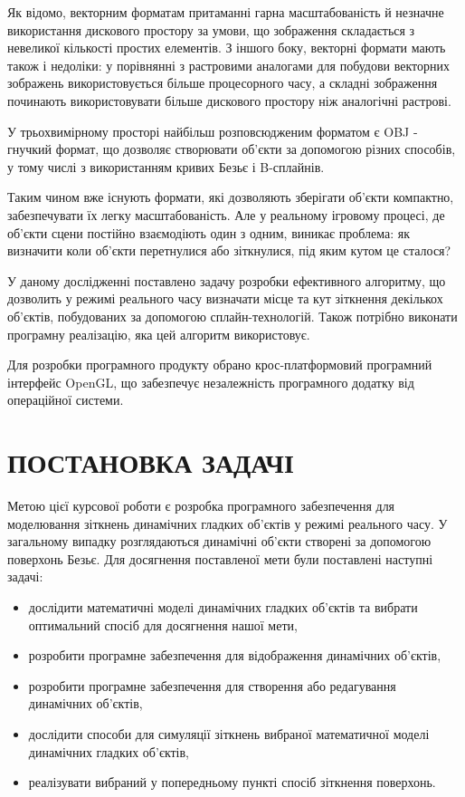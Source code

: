 \documentclass[14pt,a4paper]{extarticle}
\theoremstyle{definition}
\begin{document}
Як відомо, векторним форматам притаманні гарна масштабованість й незначне використання дискового простору за умови, що зображення складається з невеликої кількості простих елементів. З іншого боку, векторні формати мають також і недоліки: у порівнянні з растровими аналогами для побудови векторних зображень використовується більше процесорного часу, а складні зображення починають використовувати більше дискового простору ніж аналогічні растрові.

У трьохвимірному просторі найбільш розповсюдженим форматом є OBJ - гнучкий формат, що дозволяє створювати об'єкти за допомогою різних способів, у тому числі з використанням кривих Безьє і B-сплайнів.

Таким чином вже існують формати, які дозволяють зберігати об'єкти компактно, забезпечувати їх легку масштабованість. Але у реальному ігровому процесі, де об'єкти сцени постійно взаємодіють один з одним, виникає проблема: як визначити коли об'єкти перетнулися або зіткнулися, під яким кутом це сталося?

У даному дослідженні поставлено задачу розробки ефективного алгоритму, що дозволить у режимі реального часу визначати місце та кут зіткнення декількох об'єктів, побудованих за допомогою сплайн-технологій. Також потрібно виконати програмну реалізацію, яка цей алгоритм використовує.

Для розробки програмного продукту обрано крос-платформовий програмний інтерфейс OpenGL, що забезпечує незалежність програмного додатку від операційної системи.

\section*{ПОСТАНОВКА ЗАДАЧІ}

Метою цієї курсової роботи є розробка програмного забезпечення для моделювання зіткнень динамічних гладких об'єктів у режимі реального часу. У загальному випадку розглядаються динамічні об'єкти створені за допомогою поверхонь Безьє. Для досягнення поставленої мети були поставлені наступні задачі:

\begin{itemize}
\item дослідити математичні моделі динамічних гладких об'єктів та вибрати оптимальний спосіб для досягнення нашої мети,
\item розробити програмне забезпечення для відображення динамічних об'єктів,
\item розробити програмне забезпечення для створення або редагування динамічних об'єктів,
\item дослідити способи для симуляції зіткнень вибраної математичної моделі динамічних гладких об'єктів,
\item реалізувати вибраний у попередньому пункті спосіб зіткнення поверхонь.
\end{itemize}
\end{document}
